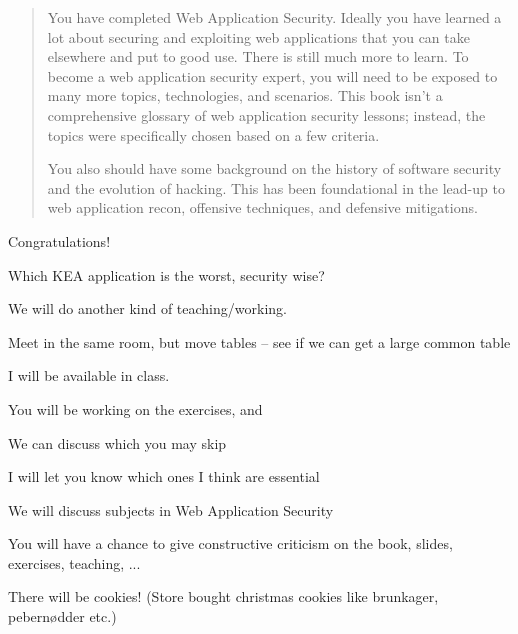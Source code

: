 \documentclass[Screen16to9,17pt]{foils}
\begin{document}
\begin{quote}
You have completed Web Application Security. Ideally you have learned a lot about
securing and exploiting web applications that you can take elsewhere and put to good
use. There is still much more to learn. To become a web application security expert,
you will need to be exposed to many more topics, technologies, and scenarios.
This book isn’t a comprehensive glossary of web application security lessons; instead,
the topics were specifically chosen based on a few criteria.

You also should have some background on the history of software security and the
evolution of hacking. This has been foundational in the lead-up to web application
recon, offensive techniques, and defensive mitigations.
\end{quote}

\begin{list2}
\item Congratulations!
\end{list2}




\begin{list2}
\item Which KEA application is the worst, security wise?
\end{list2}




We will do another kind of teaching/working.

Meet in the same room, but move tables -- see if we can get a large common table

I will be available in class.

\begin{list2}
\item You will be working on the exercises, and
\item We can discuss which you may skip
\item I will let you know which ones I think are essential
\item We will discuss subjects in Web Application Security
\item You will have a chance to give constructive criticism on the book, slides, exercises, teaching, ...
\end{list2}

There will be cookies! (Store bought christmas cookies like brunkager, pebernødder etc.)


\slidenext{}
\end{document}
